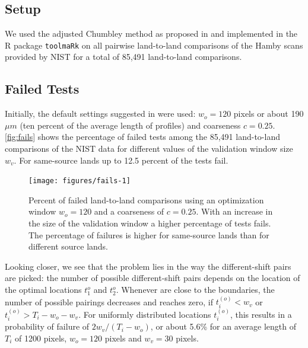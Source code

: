\documentclass[12pt]{article}
\begin{document}
\subsection{Setup}\label{setup}



We used the adjusted Chumbley method as proposed in \citet{hadler} and
implemented in the R package \texttt{toolmaRk} \citep{toolmark} on all
pairwise land-to-land comparisons of the Hamby scans provided by NIST
for a total of 85,491 land-to-land comparisons.

\subsection{Failed Tests}\label{failed-tests}

Initially, the default settings suggested in \citet{hadler} were used:
\(w_o = 120\) pixels or about 190 \(\mu m\) (ten percent of the average
length of profiles) and coarseness \(c = 0.25\). \autoref{fig:fails}
shows the percentage of failed tests among the 85,491 land-to-land
comparisons of the NIST data for different values of the validation
window size \(w_v\). For same-source lands up to 12.5 percent of the
tests fail.

\begin{figure}

{\centering \texttt{[image: figures/fails-1]} 

}

\caption{Percent of failed land-to-land comparisons using an optimization window $w_o = 120$ and a coarseness of $c = 0.25$. With an increase in the size of the validation window  a higher percentage of tests fails. The percentage of failures is higher for same-source lands than for different source lands.}\label{fig:fails}
\end{figure}

Looking closer, we see that the problem lies in the way the
different-shift pairs are picked: the number of possible different-shift
pairs depends on the location of the optimal locations \(t_1^o\) and
\(t_2^o\). Whenever are close to the boundaries, the number of possible
pairings decreases and reaches zero, if \(t_i^{(o)} < w_v\) or
\(t_i^{(o)} > T_i-w_o- w_v\). For uniformly distributed locations
\(t_i^{(o)}\), this results in a probability of failure of
\(2 w_v / (T_i-w_o)\), or about 5.6\% for an average length of \(T_i\)
of 1200 pixels, \(w_o = 120\) pixels and \(w_v = 30\) pixels.
\end{document}
